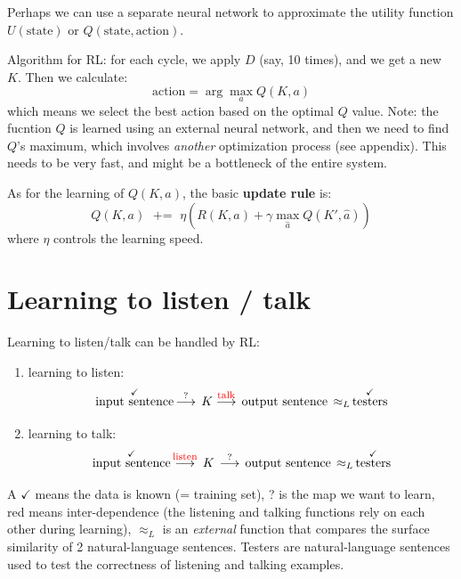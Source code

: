 \documentclass[12pt]{article}
\begin{document}
Perhaps we can use a separate neural network to approximate the utility function $U(\mbox{state})$ or $Q(\mbox{state},\mbox{action})$.

Algorithm for RL:  for each cycle, we apply $D$ (say, 10 times), and we get a new $K$.  Then we calculate:
\begin{equation}
\mbox{action} = \arg\max_a Q(K,a)
\end{equation}
which means we select the best action based on the optimal $Q$ value.  Note:  the fucntion $Q$ is learned using an external neural network, and then we need to find $Q$'s maximum, which involves \textit{another} optimization process (see appendix).  This needs to be very fast, and might be a bottleneck of the entire system.

As for the learning of $Q(K,a)$, the basic \textbf{update rule} is:
\begin{equation}
Q(K,a) \;\mbox{ += }\; \eta (R(K,a) + \gamma \max_{\hat{a}} Q(K',\hat{a})) 
\end{equation}
where $\eta$ controls the learning speed.

\section{Learning to listen / talk}
\label{sec:learning-to-listen-talk}

Learning to listen/talk can be handled by RL:

\begin{enumerate}
\item learning to listen:
\begin{equation}
\stackrel{\checkmark}{\mbox{input sentence}} \, \stackrel{?}{\longrightarrow} \, K \stackrel{{\color{red}\mbox{\footnotesize talk}}}{\longrightarrow} \, \mbox{output sentence} \, \approx_L \, \stackrel{\checkmark}{\mbox{testers}}
\end{equation}
\item learning to talk:
\begin{equation}
\stackrel{\checkmark}{\mbox{input sentence}} \, \stackrel{{\color{red}\mbox{\footnotesize listen}}}{\longrightarrow} \, K \, \stackrel{?}{\longrightarrow} \, \mbox{output sentence} \, \approx_L \, \stackrel{\checkmark}{\mbox{testers}}
\end{equation}
\end{enumerate}

A $\checkmark$ means the data is known (= training set), ? is the map we want to learn, {\color{red}red} means inter-dependence (the listening and talking functions rely on each other during learning), $\approx_L$ is an \textit{external} function that compares the surface similarity of 2 natural-language sentences.  Testers are natural-language sentences used to test the correctness of listening and talking examples.
\end{document}
